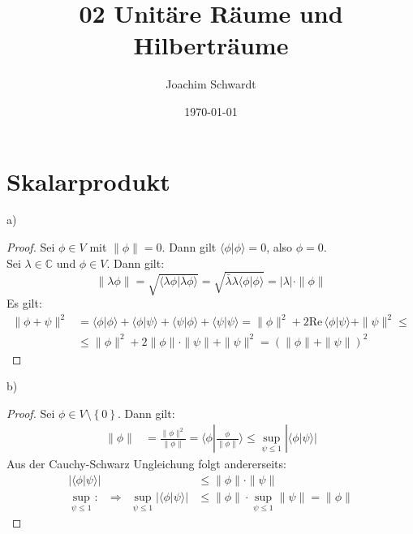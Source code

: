 \documentclass[a4paper,12pt]{article}
\newcommand{\brak}{}
\newcommand{\kla}{}
\newcommand{\klammer}{}
\begin{document}
\title{02 Unitäre Räume und Hilberträume}
\author{Joachim Schwardt}
\date{\today}
\maketitle

\section{Skalarprodukt}
a)
\begin{proof}
Sei $\phi\in V$ mit $\|\phi\|=0$. Dann gilt $\brak\langle {\phi}| {\phi}\rangle=0$, also $\phi=0$.\\
Sei $\lambda\in\mathbb{C}$ und $\phi\in V$. Dann gilt:
$$\|\lambda\phi\|=\sqrt{\brak\langle {\lambda\phi}| {\lambda\phi}\rangle}=\sqrt{\bar{\lambda}\lambda\brak\langle {\phi}| {\phi}\rangle}=|\lambda|\cdot\|\phi\|$$
Es gilt:
\begin{align*}
\|\phi+\psi\|^2&=\brak\langle {\phi}| {\phi}\rangle+\brak\langle {\phi}| {\psi}\rangle+\brak\langle {\psi}| {\phi}\rangle+\brak\langle {\psi}| {\psi}\rangle=\|\phi\|^2+2\mathrm{Re\,}\brak\langle {\phi}| {\psi}\rangle+\|\psi\|^2\le\\
&\le\|\phi\|^2+2\|\phi\|\cdot\|\psi\|+\|\psi\|^2=\kla\left( {\|\phi\|+\|\psi\|} \right)^2
\end{align*}
\end{proof}
b)
\begin{proof}
Sei $\phi\in V\setminus\klammer\left\{ {0} \right\}$. Dann gilt:
\begin{align*}
\|\phi\|&=\frac{\|\phi\|^2}{\|\phi\|}=\brak\langle {\phi}| {\frac{\phi}{\|\phi\|}}\rangle\le\sup_{\psi\le 1}|\brak\langle {\phi}| {\psi}\rangle|
\end{align*}
Aus der Cauchy-Schwarz Ungleichung folgt andererseits:
\begin{align*}
|\brak\langle {\phi}| {\psi}\rangle|&\le \|\phi\|\cdot\|\psi\|\\
\sup_{\psi\le 1}:\ \ \ \Rightarrow\ \ \sup_{\psi\le 1}|\brak\langle {\phi}| {\psi}\rangle|&\le\|\phi\|\cdot\sup_{\psi\le 1}\|\psi\|=\|\phi\|
\end{align*}
\end{proof}
\end{document}
